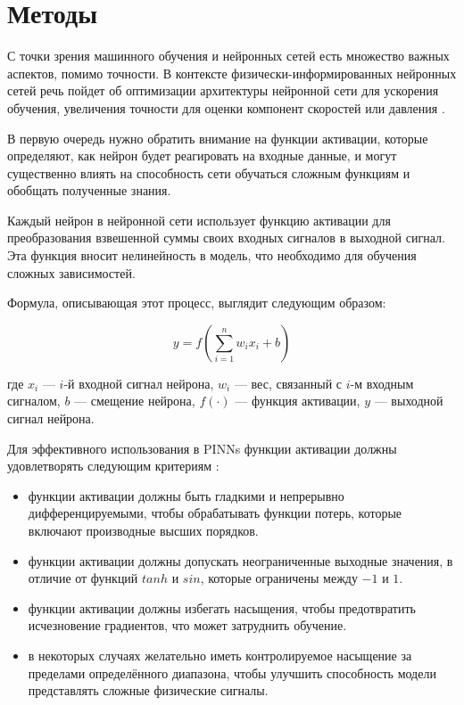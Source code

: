 \chapter{Методы}
С точки зрения машинного обучения и нейронных сетей есть множество важных аспектов,
помимо точности. В контексте физически-информированных нейронных сетей речь пойдет
об оптимизации архитектуры нейронной сети для ускорения обучения, увеличения точности
для оценки компонент скоростей или давления \cite{Tommaso2024pinn}.

В первую очередь нужно обратить внимание на функции активации, которые определяют,
как нейрон будет реагировать на входные данные, и могут существенно влиять на способность
сети обучаться сложным функциям и обобщать полученные знания.

Каждый нейрон в нейронной сети использует функцию активации для преобразования взвешенной
суммы своих входных сигналов в выходной сигнал. Эта функция вносит нелинейность в модель,
что необходимо для обучения сложных зависимостей.

Формула, описывающая этот процесс, выглядит следующим образом:

$$y = f(\sum_{i=1}^{n} w_i x_i + b)$$

где $x_i$ — $i$-й входной сигнал нейрона, $w_i$ — вес, связанный с $i$-м входным сигналом, $b$
— смещение нейрона, $f(\cdot)$ — функция активации, $y$ — выходной сигнал нейрона.

Для эффективного использования в PINNs функции активации должны удовлетворять следующим
критериям \cite{0d752c79fb816703274a3d37f85a85689a2a9405}:
\begin{itemize}
    \item функции активации должны быть гладкими и
    непрерывно дифференцируемыми, чтобы обрабатывать функции потерь, которые включают
    производные высших порядков.
    \item функции активации должны допускать неограниченные
    выходные значения, в отличие от функций $tanh$ и $sin$, которые ограничены между $-1$ и $1$.
    \item функции активации должны избегать насыщения, чтобы предотвратить
    исчезновение градиентов, что может затруднить обучение.
    \item в некоторых случаях желательно иметь контролируемое насыщение за пределами определённого
    диапазона, чтобы улучшить способность модели представлять сложные физические сигналы.
\end{itemize}


